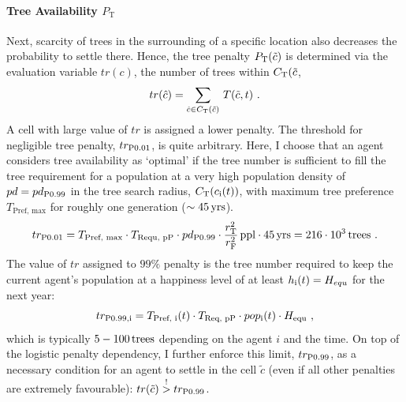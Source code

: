 \paragraph{Tree Availability $P_\text{T}$}
Next, scarcity of trees in the surrounding of a specific location also decreases the probability to settle there.
Hence, the tree penalty $P_{\rm T}(\tilde{c})$ is determined via the evaluation variable $tr(c)$, the number of trees within $C_{\rm T}(\tilde{c}$,
\begin{equation}
	tr(\hat{c}) = \sum_{\hat{c} \in C_{\rm T}(\tilde{c})}\, T(\tilde{c},t) \ .
\end{equation}
A cell with large value of $tr$ is assigned a lower penalty.
The threshold for negligible tree penalty, $tr_{\rm P0.01}$, is quite arbitrary.
Here, I choose that an agent considers tree availability as `optimal' if the tree number is sufficient to fill the tree requirement for a population at a very high population density of $pd = pd_{\rm P0.99}$ in the tree search radius, $C_{\rm T}(c_{\rm i}(t))$, with maximum tree preference $T_\text{Pref, max}$  for roughly one generation ($\sim 45\, {\rm yrs}$).
\begin{equation}
tr_{\rm P0.01} = T_\text{Pref, max} \cdot T_\text{Requ, pP} \cdot pd_{\rm P0.99} \cdot \frac{r_{\rm T}^2}{r_{\rm F}^{2}} \, {\rm ppl} \cdot 45\, {\rm yrs} = 
216\cdot 10^3 \, {\rm trees} \ .
\end{equation} 
The value of $tr$ assigned to $99\%$ penalty is the tree number required to keep the current agent's population at a happiness level of at least $h_{\rm i}(t) = H_{equ}$ for the next year:
\begin{equation}%
tr_{\rm P0.99, i}= T_\text{Pref, i}(t) \cdot T_\text{Req, pP} \cdot pop_{\rm i}(t) \cdot H_\text{equ} \ ,
\end{equation}
which is typically $5-100\, {\rm trees}$ depending on the agent $i$ and the time.
On top of the logistic penalty dependency, I further enforce this limit, $tr_{\rm P0.99}$, as a necessary condition for an agent to settle in the cell $\tilde{c}$ (even if all other penalties are extremely favourable): $tr(\tilde{c}) \stackrel{!}{>} tr_{\rm P0.99}$. 
